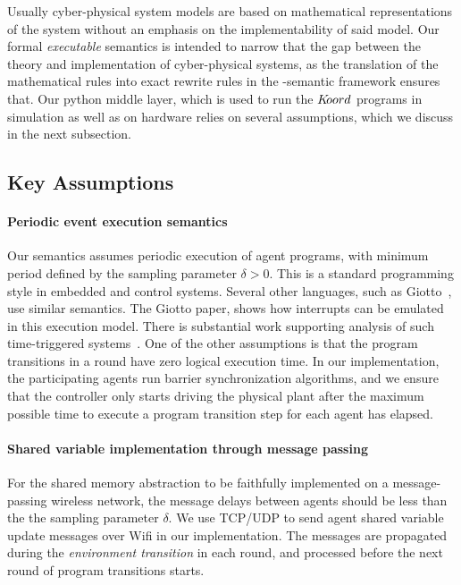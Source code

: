 Usually cyber-physical system models are based on mathematical representations of the system without an emphasis on the implementability of said model. Our formal \emph{executable} semantics is intended to narrow that the gap between the theory and implementation of cyber-physical systems, as the translation of the mathematical rules into exact rewrite rules in the \K-semantic framework ensures that. Our python middle layer, which is used to run the $K\kern-2pt oord$ programs in simulation as well as on hardware relies on several assumptions, which we discuss in the next subsection.



\subsection{Key Assumptions} 

\paragraph*{Periodic event execution semantics}
 Our semantics assumes periodic execution of agent programs, with minimum period defined by the sampling parameter $\delta>0$. This is a standard programming style in embedded and control systems. Several other languages, such as Giotto~\cite{henzinger2003giotto,benveniste2003synchronous}, use  similar semantics. The Giotto paper, shows how  interrupts can be emulated in this execution model. There is substantial work supporting analysis of such time-triggered systems~\cite{WMLM:TECS2010}. One of the other assumptions is that the program transitions in a round have  zero logical execution time. In our implementation, the participating agents run barrier synchronization algorithms, and we ensure that the controller only starts driving the physical plant after the maximum possible time to execute a program transition step for each agent has elapsed. 


\paragraph*{Shared variable implementation through message passing}
For the shared memory abstraction to be faithfully implemented on a message-passing wireless network, the message delays between agents should be less than the the sampling parameter $\delta$. We use TCP/UDP to send agent shared variable update messages over Wifi in our implementation. The messages are propagated during the \emph{environment transition} in each round, and processed before the next round of program transitions starts.

